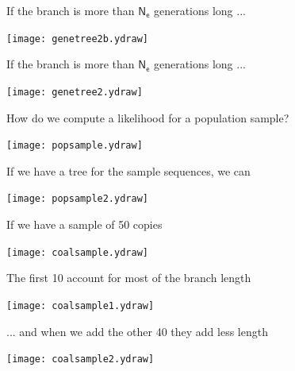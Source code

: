 \documentclass[bluish,slideColor,colorBG,pdf]{prosper}
\begin{document}
\begin{slide}[Replace]{If the branch is more than $\mathsf{N_e}$ generations long ... }

\centerline{\texttt{[image: genetree2b.ydraw]}}

\end{slide}

\begin{slide}[Replace]{If the branch is more than $\mathsf{N_e}$ generations long ... }

\centerline{\texttt{[image: genetree2.ydraw]}}

\end{slide}

\begin{slide}[Replace]{How do we compute a likelihood for a population sample? }

\centerline{\texttt{[image: popsample.ydraw]}}

\end{slide}

\begin{slide}[Replace]{If we have a tree for the sample sequences, we can}

\centerline{\texttt{[image: popsample2.ydraw]}}

\end{slide}

\begin{slide}[Replace]{If we have a sample of 50 copies}

\centerline{\texttt{[image: coalsample.ydraw]}}

\end{slide}

\begin{slide}[Replace]{The first 10 account for most of the branch length}

\centerline{\texttt{[image: coalsample1.ydraw]}}

\end{slide}

\begin{slide}[Replace]{ ... and when we add the other 40 they add less length}

\centerline{\texttt{[image: coalsample2.ydraw]}}

\end{slide}
\end{document}
